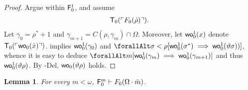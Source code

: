\documentclass[UKenglish,cleveref,DIV=12]{scrartcl}
\let\forall\forallAlt
\newtheorem{lemma}{Lemma}
\theoremstyle{definition}
\theoremstyle{definition}
\begin{document}
\begin{proof}
Argue within $\mathsf{F}_0^1$, and assume
\begin{align}\label{exteqn:F0tech1}
  \mathsf{T}_0(\ulcorner{F_0(\dot\rho)}\urcorner).
\end{align}
Let $\gamma_0=\rho^*+1$ and $\gamma_{m+1}=C(\rho,\gamma_m)\cap\Omega$.
Moreover, let $\mathsf{wo}_0^1(x)$ denote $\mathsf{T}_0(\ulcorner{\mathsf{wo}_0(\dot x)}\urcorner)$.
 implies $\mathsf{wo}_0^1(\gamma_0)$ and
$\forall\sigma<\rho[\wo_0^1(\sigma^*)\implies\wo_0^1(\vartheta\sigma))]$, whence
it is easy to deduce $\forall m[\wo_0^1(\gamma_m)\implies\wo_0^1(\gamma_{m+1})]$
and thus $\mathsf{wo}_0^1(\vartheta\rho)$. By -Del, $\mathsf{wo}_0(\vartheta\rho)$ holds.
\end{proof}
\begin{lemma}\label{extprop:F0wellordering}
  For every $m<\omega$, $\mathsf{F}_0^m\vdash F_0(\Omega\cdot\bar{m})$.
\end{lemma}
\end{document}

